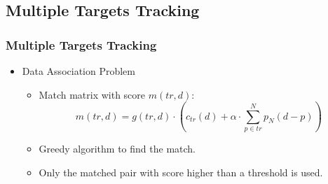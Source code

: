 \documentclass{beamer}
\begin{document}
\subsection{Multiple Targets Tracking}
\begin{frame}
	\frametitle{Multiple Targets Tracking\scriptsize\cite{eth_biwi_00633}}
	\begin{itemize}
		\item Data Association Problem
		\begin{itemize}
			\item Match matrix with score $m(tr, d)$:
			\begin{equation}
				m(tr, d)=g(tr,d)\cdot(c_{tr}(d)+\alpha\cdot\sum_{p\in tr}^{N}p_{N}(d-p))
			\end{equation}
			\item Greedy algorithm to find the match.
			\item Only the matched pair with score higher than a threshold is used.
		\end{itemize}
	\end{itemize}
\end{frame}
\end{document}
